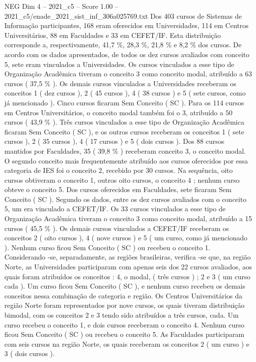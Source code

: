 \begin{textsample}{NEG Dim 4 – 2021\_c5 – Score 1.00 – 2021\_c5/enade\_2021\_sist\_inf\_306a025769.txt}
Dos 403 cursos de Sistemas de Informação participantes, 168 eram oferecidos em Universidades, 114 em Centros Universitários, 88 em Faculdades e 33 em CEFET/IF.
Esta distribuição corresponde a, respectivamente, 41,7 \%, 28,3 \%, 21,8 \% e 8,2 \% dos cursos.
De acordo com os dados apresentados, de todos os dez cursos avaliados com conceito 5, sete eram vinculados a Universidades.
Os cursos vinculados a esse tipo de Organização Acadêmica tiveram o conceito 3 como conceito modal, atribuído a 63 cursos ( 37,5 \% ).
Os demais cursos vinculados a Universidades receberam os conceitos 1 ( dez cursos ), 2 ( 45 cursos ), 4 ( 38 cursos ) e 5 ( sete cursos, como já mencionado ).
Cinco cursos ficaram Sem Conceito ( SC ).
Para os 114 cursos em Centros Universitários, o conceito modal também foi o 3, atribuído a 50 cursos ( 43,9 \% ).
Três cursos vinculados a esse tipo de Organização Acadêmica ficaram Sem Conceito ( SC ), e os outros cursos receberam os conceitos 1 ( sete cursos ), 2 ( 35 cursos ), 4 ( 17 cursos ) e 5 ( dois cursos ).
Dos 88 cursos mantidos por Faculdades, 35 ( 39,8 \% ) receberam conceito 3, o conceito modal.
O segundo conceito mais frequentemente atribuído aos cursos oferecidos por essa categoria de IES foi o conceito 2, recebido por 30 cursos.
Na sequência, oito cursos obtiveram o conceito 1, outros oito cursos, o conceito 4 ; nenhum curso obteve o conceito 5.
Dos cursos oferecidos em Faculdades, sete ficaram Sem Conceito ( SC ).
Segundo os dados, entre os dez cursos avaliados com o conceito 5, um era vinculado a CEFET/IF.
Os 33 cursos vinculados a esse tipo de Organização Acadêmica tiveram o conceito 3 como conceito modal, atribuído a 15 cursos ( 45,5 \% ).
Os demais cursos vinculados a CEFET/IF receberam os conceitos 2 ( oito cursos ), 4 ( nove cursos ) e 5 ( um curso, como já mencionado ).
Nenhum curso ficou Sem Conceito ( SC ) ou recebeu o conceito 1.
Considerando -se, separadamente, as regiões brasileiras, verifica -se que, na região Norte, as Universidades participaram com apenas seis dos 22 cursos avaliados, aos quais foram atribuídos os conceitos : 4, o modal, ( três cursos ) ; 2 e 3 ( um curso cada ).
Um curso ficou Sem Conceito ( SC ), e nenhum curso recebeu os demais conceitos nessa combinação de categoria e região.
Os Centros Universitários da região Norte foram representados por nove cursos, os quais tiveram distribuição bimodal, com os conceitos 2 e 3 tendo sido atribuídos a três cursos, cada.
Um curso recebeu o conceito 1, e dois cursos receberam o conceito 4.
Nenhum curso ficou Sem Conceito ( SC ) ou recebeu o conceito 5.
As Faculdades participaram com seis cursos na região Norte, os quais receberam os conceitos 2 ( um curso ) e 3 ( dois cursos ).

\end{textsample}
